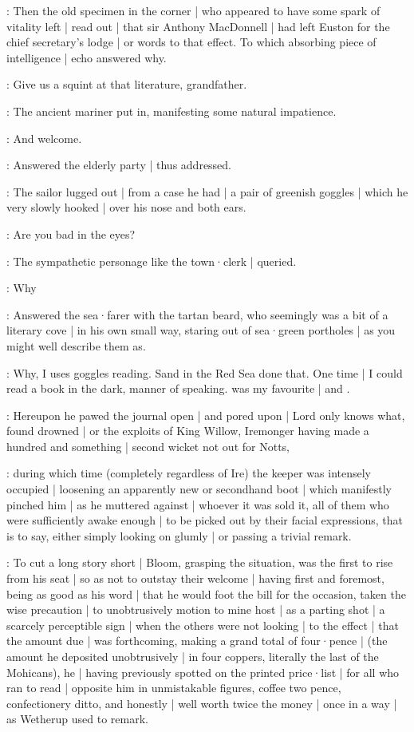 :
Then the old specimen in the corner |
who appeared to have some spark of vitality left |
read out |
that sir Anthony MacDonnell |
had left Euston for the chief secretary's lodge |
or words to that effect.
To which absorbing piece of intelligence |
echo answered why.

\Murphy:
Give us a squint at that literature,
grandfather.

:
The ancient mariner put in,
manifesting some natural impatience.%

\OldSpecimen:
And welcome.

:
Answered the elderly party |
thus addressed.

:
The sailor lugged out |
from a case he had |
a pair of greenish goggles |
which he very slowly hooked |
over his nose and both ears.

\Campbell:
Are you bad in the eyes?

:
The sympathetic personage like the town·clerk |
queried.

\Murphy:
Why

:
Answered the sea·farer with the tartan beard,
who seemingly was a bit of a literary cove |
in his own small way,
staring out of sea·green portholes |
as you might well describe them as.

\Murphy:
Why,
I uses goggles reading.
Sand in the Red Sea done that.
One time |
I could read a book in the dark,
manner of speaking.
 was my favourite |
and .

:
Hereupon he pawed the journal open |
and pored upon |
Lord only knows what,
found drowned |
or the exploits of King Willow,
Iremonger having made a hundred and something |
second wicket not out for Notts,

:
during which time
(completely regardless of Ire)
the keeper was intensely occupied |
loosening an apparently new or secondhand boot |
which manifestly pinched him |
as he muttered against |
whoever it was sold it,
all of them who were sufficiently awake enough |
to be picked out by their facial expressions,
that is to say,
either simply looking on glumly |
or passing a trivial remark.%

:
To cut a long story short |
Bloom,
grasping the situation,
was the first to rise from his seat |
so as not to outstay their welcome |
having first and foremost,
being as good as his word |
that he would foot the bill for the occasion,
taken the wise precaution |
to unobtrusively motion to mine host |
as a parting shot |
a scarcely perceptible sign |
when the others were not looking |
to the effect |
that the amount due |
was forthcoming,
making a grand total of four·pence |
(the amount he deposited unobtrusively |
in four coppers,
literally the last of the Mohicans),
he |
having previously spotted on the printed price·list |
for all who ran to read |
opposite him in unmistakable figures,
coffee two pence,
confectionery ditto,
and honestly |
well worth twice the money |
once in a way |
as Wetherup used to remark.

